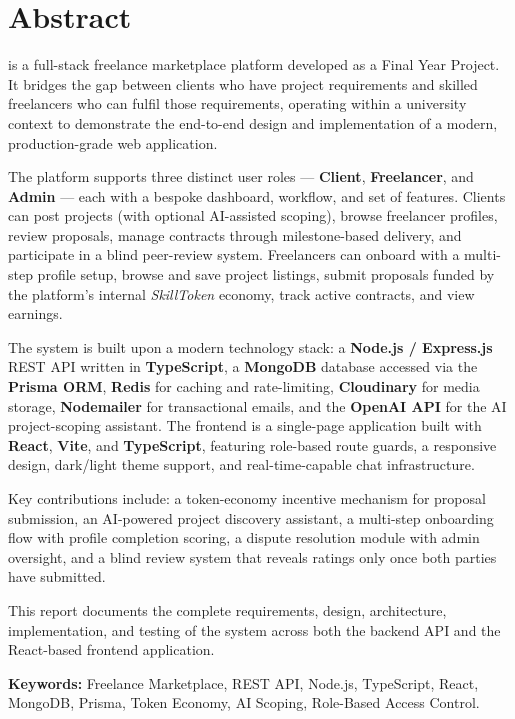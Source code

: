 \chapter*{Abstract}

\projectname{} is a full-stack freelance marketplace platform developed as a Final Year Project. It bridges the gap between clients who have project requirements and skilled freelancers who can fulfil those requirements, operating within a university context to demonstrate the end-to-end design and implementation of a modern, production-grade web application.

The platform supports three distinct user roles --- \textbf{Client}, \textbf{Freelancer}, and \textbf{Admin} --- each with a bespoke dashboard, workflow, and set of features. Clients can post projects (with optional AI-assisted scoping), browse freelancer profiles, review proposals, manage contracts through milestone-based delivery, and participate in a blind peer-review system. Freelancers can onboard with a multi-step profile setup, browse and save project listings, submit proposals funded by the platform's internal \textit{SkillToken} economy, track active contracts, and view earnings.

The system is built upon a modern technology stack: a \textbf{Node.js / Express.js} REST API written in \textbf{TypeScript}, a \textbf{MongoDB} database accessed via the \textbf{Prisma ORM}, \textbf{Redis} for caching and rate-limiting, \textbf{Cloudinary} for media storage, \textbf{Nodemailer} for transactional emails, and the \textbf{OpenAI API} for the AI project-scoping assistant. The frontend is a single-page application built with \textbf{React}, \textbf{Vite}, and \textbf{TypeScript}, featuring role-based route guards, a responsive design, dark/light theme support, and real-time-capable chat infrastructure.

Key contributions include: a token-economy incentive mechanism for proposal submission, an AI-powered project discovery assistant, a multi-step onboarding flow with profile completion scoring, a dispute resolution module with admin oversight, and a blind review system that reveals ratings only once both parties have submitted.

This report documents the complete requirements, design, architecture, implementation, and testing of the \projectname{} system across both the backend API and the React-based frontend application.

\textbf{Keywords:} Freelance Marketplace, REST API, Node.js, TypeScript, React, MongoDB, Prisma, Token Economy, AI Scoping, Role-Based Access Control.

\clearpage
